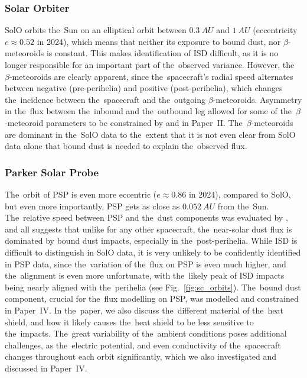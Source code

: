 \subsubsection{Solar Orbiter}

SolO orbits the~Sun on an elliptical orbit between $\SI{0.3}{AU}$ and $\SI{1}{AU}$ (eccentricity $e \approx 0.52$ in 2024), which means that neither its exposure to bound dust, nor $\beta$-meteoroids is constant. This makes identification of ISD difficult, as it is no longer responsible for an important part of the~observed variance. However, the~$\beta$-meteoroids are clearly apparent, since the~spacecraft's radial speed alternates between negative (pre-perihelia) and positive (post-perihelia), which changes the~incidence between the~spacecraft and the~outgoing $\beta$-meteoroids. Asymmetry in the~flux between the~inbound and the~outbound leg allowed for some of the~$\beta$-meteoroid parameters to be constrained by \citet{zaslavsky2021first} and in Paper~II. The~$\beta$-meteoroids are dominant in the~SolO data to the~extent that it is not even clear from SolO data alone that bound dust is needed to explain the~observed flux.

\subsubsection{Parker Solar Probe}

The~orbit of PSP is even more eccentric ($e \approx 0.86$ in 2024), compared to SolO, but even more importantly, PSP gets as close as $\SI{0.052}{AU}$ from the~Sun. The~relative speed between PSP and the~dust components was evaluated by \citet{szalay2020near}, and all suggests that unlike for any other spacecraft, the~near-solar dust flux is dominated by bound dust impacts, especially in the~post-perihelia. While ISD is difficult to distinguish in SolO data, it is very unlikely to be confidently identified in PSP data, since the~variation of the~flux on PSP is even much higher, and the~alignment is even more unfortunate, with the~likely peak of ISD impacts being nearly aligned with the~perihelia (see Fig.~\ref{fig:sc_orbits}). The~bound dust component, crucial for the~flux modelling on PSP, was modelled and constrained in Paper~IV. In the~paper, we also discuss the~different material of the~heat shield, and how it likely causes the~heat shield to be less sensitive to the~impacts. The~great variability of the~ambient conditions poses additional challenges, as the~electric potential, and even conductivity of the~spacecraft changes throughout each orbit significantly, which we also investigated and discussed in Paper~IV.

